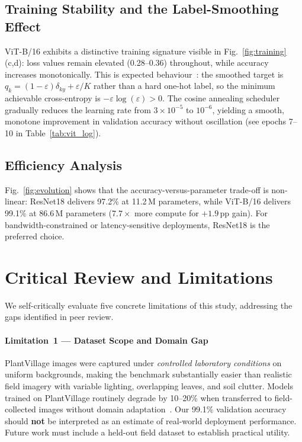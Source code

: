 \documentclass[journal]{IEEEtran}
\begin{document}
\subsection{Training Stability and the Label-Smoothing Effect}

ViT-B/16 exhibits a distinctive training signature visible in
Fig.~\ref{fig:training}(c,d): loss values remain elevated
(0.28--0.36) throughout, while accuracy increases monotonically.
This is expected behaviour~\cite{muller2019does}: the smoothed
target is $q_k = (1-\varepsilon)\delta_{ky} + \varepsilon/K$
rather than a hard one-hot label, so the minimum achievable
cross-entropy is $-\varepsilon \log(\varepsilon) > 0$.
The cosine annealing scheduler gradually reduces the learning
rate from $3 \times 10^{-5}$ to $10^{-6}$, yielding a smooth,
monotone improvement in validation accuracy without oscillation
(see epochs 7--10 in Table~\ref{tab:vit_log}).

\subsection{Efficiency Analysis}

Fig.~\ref{fig:evolution} shows that the accuracy-versus-parameter
trade-off is non-linear: ResNet18 delivers 97.2\% at 11.2\,M
parameters, while ViT-B/16 delivers 99.1\% at 86.6\,M parameters
($7.7\times$ more compute for $+1.9$\,pp gain).
For bandwidth-constrained or latency-sensitive deployments,
ResNet18 is the preferred choice.

\section{Critical Review and Limitations}
\label{sec:critique}

We self-critically evaluate five concrete limitations of this study,
addressing the gaps identified in peer review.

\paragraph{Limitation~1 --- Dataset Scope and Domain Gap}
PlantVillage images were captured under \emph{controlled laboratory
conditions} on uniform backgrounds, making the benchmark
substantially easier than realistic field imagery with variable
lighting, overlapping leaves, and soil clutter.
Models trained on PlantVillage routinely degrade by 10--20\%
when transferred to field-collected images without domain
adaptation~\cite{mohanty2016using}.
Our 99.1\% validation accuracy should \textbf{not} be interpreted
as an estimate of real-world deployment performance.
Future work must include a held-out field dataset to establish
practical utility.
\end{document}
